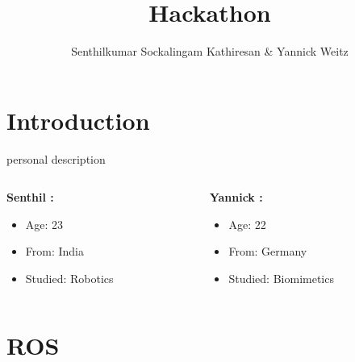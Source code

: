 \documentclass[xcolor=dvipsnames]{beamer}
\title{Hackathon}
\author{Senthilkumar Sockalingam Kathiresan \& Yannick Weitz}
\begin{document}
\begin{frame}
\titlepage
\end{frame}

\begin{frame}
\tableofcontents[section]
\end{frame}

\section{Introduction}


\begin{frame}{personal description}
\begin{columns}

\begin{column}[b]{0.5\textwidth}
\begin{center}
\textbf{Senthil :}

\begin{itemize}
\item Age: 23
\medskip
\item From: India
\medskip
\item Studied: Robotics
\end{itemize}

\end{center}
\end{column}
\begin{column}[b]{0.5\textwidth}  %
\begin{center}
\textbf{Yannick :}

\begin{itemize}
\item Age: 22
\medskip
\item From: Germany
\medskip
\item Studied: Biomimetics
\end{itemize}

\end{center}
\end{column}
\end{columns}

\end{frame}
\section{ROS}
\end{document}

